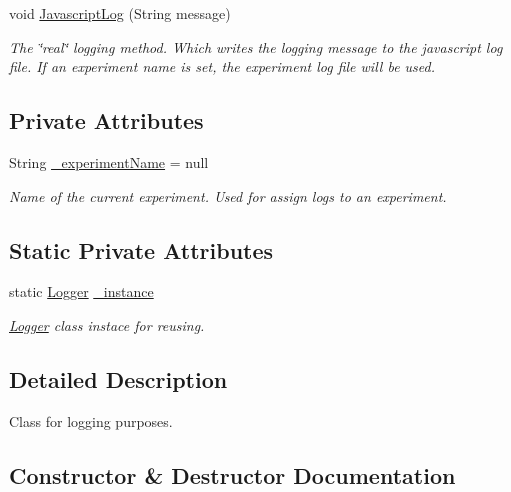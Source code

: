 \begin{DoxyCompactItemize}
void \hyperlink{class_web_analyzer_1_1_util_1_1_logger_ab9c037396c9c5ab28aac4a9304ef1461}{Javascript\+Log} (String message)
\begin{DoxyCompactList}\small\item\em The \char`\"{}real\char`\"{} logging method. Which writes the logging message to the javascript log file. If an experiment name is set, the experiment log file will be used. \end{DoxyCompactList}\end{DoxyCompactItemize}
\subsection*{Private Attributes}
\begin{DoxyCompactItemize}
\item 
String \hyperlink{class_web_analyzer_1_1_util_1_1_logger_abf60192ad5104e885eb651bfd8f5eb78}{\+\_\+experiment\+Name} = null
\begin{DoxyCompactList}\small\item\em Name of the current experiment. Used for assign logs to an experiment. \end{DoxyCompactList}\end{DoxyCompactItemize}
\subsection*{Static Private Attributes}
\begin{DoxyCompactItemize}
\item 
static \hyperlink{class_web_analyzer_1_1_util_1_1_logger}{Logger} \hyperlink{class_web_analyzer_1_1_util_1_1_logger_a8543413dc13f3636a0c3a717d75ed6b0}{\+\_\+instance}
\begin{DoxyCompactList}\small\item\em \hyperlink{class_web_analyzer_1_1_util_1_1_logger}{Logger} class instace for reusing. \end{DoxyCompactList}\end{DoxyCompactItemize}


\subsection{Detailed Description}
Class for logging purposes. 



\subsection{Constructor \& Destructor Documentation}
\hypertarget{class_web_analyzer_1_1_util_1_1_logger_aa8818c2a85be10d6ba6df1b6bdc7761c}{}
